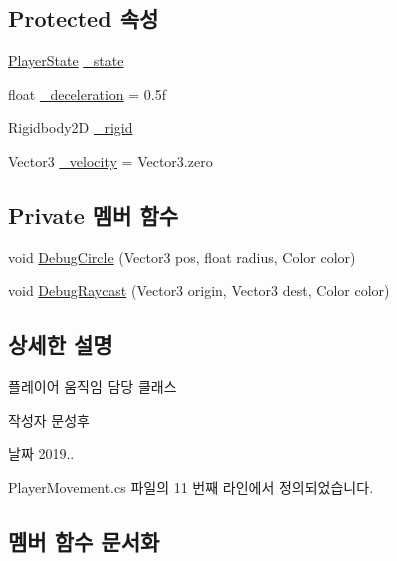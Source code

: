 \subsection*{Protected 속성}
\begin{DoxyCompactItemize}
\item 
\mbox{\hyperlink{class_player_state}{Player\+State}} \mbox{\hyperlink{class_player_movement_af88a64a22da9ba3a831b0fe31bd8e7db}{\+\_\+state}}
\item 
float \mbox{\hyperlink{class_player_movement_accf40aeeabcd73e5aefa1ced890c167d}{\+\_\+deceleration}} = 0.\+5f
\item 
Rigidbody2D \mbox{\hyperlink{class_movement_a8b24a93b5f529e53c668ff81bde13c0d}{\+\_\+rigid}}
\item 
Vector3 \mbox{\hyperlink{class_movement_a6ea6768262f1dca968be8ee5c14a0cc1}{\+\_\+velocity}} = Vector3.\+zero
\end{DoxyCompactItemize}
\subsection*{Private 멤버 함수}
\begin{DoxyCompactItemize}
\item 
void \mbox{\hyperlink{class_player_movement_a6f77ea4796901d5e2a476e2f8ec49b51}{Debug\+Circle}} (Vector3 pos, float radius, Color color)
\item 
void \mbox{\hyperlink{class_player_movement_a10abf2ced0397cbfa0cc29a0296023fb}{Debug\+Raycast}} (Vector3 origin, Vector3 dest, Color color)
\end{DoxyCompactItemize}


\subsection{상세한 설명}
플레이어 움직임 담당 클래스 

\begin{DoxyAuthor}{작성자}
문성후 
\end{DoxyAuthor}
\begin{DoxyDate}{날짜}
2019.. 
\end{DoxyDate}


Player\+Movement.\+cs 파일의 11 번째 라인에서 정의되었습니다.



\subsection{멤버 함수 문서화}
\mbox{\label{class_movement_a132e2f7bc0af811ff3b1ab86c8d1f090}} 
